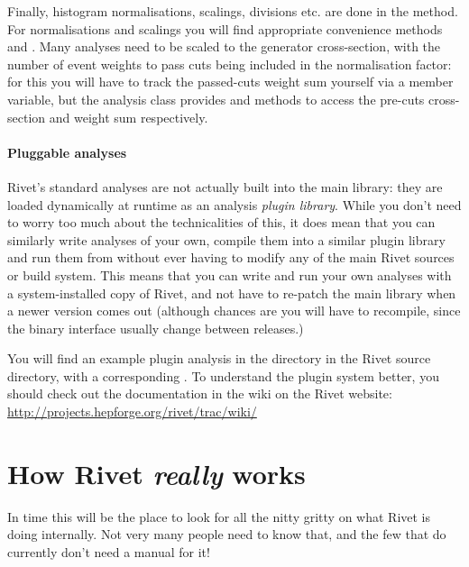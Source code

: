 \documentclass{JHEP3}
\begin{document}
Finally, histogram normalisations, scalings, divisions etc. are done in the
 method. For normalisations and scalings you will
find appropriate convenience methods  and
. Many analyses need to be scaled to
the generator cross-section, with the number of event weights to pass cuts being
included in the normalisation factor: for this you will have to track the
passed-cuts weight sum yourself via a member variable, but the analysis class
provides  and 
methods to access the pre-cuts cross-section and weight sum respectively.


\subsection{Pluggable analyses}

Rivet's standard analyses are not actually built into the main 
library: they are loaded dynamically at runtime as an analysis \emph{plugin
  library}. While you don't need to worry too much about the technicalities of
this, it does mean that you can similarly write analyses of your own, compile
them into a similar plugin library and run them from  without ever
having to modify any of the main Rivet sources or build system. This means that
you can write and run your own analyses with a system-installed copy of Rivet,
and not have to re-patch the main library when a newer version comes out
(although chances are you will have to recompile, since the binary interface usually
change between releases.)

You will find an example plugin analysis in the  directory in
the Rivet source directory, with a corresponding . To understand
the plugin system better, you should check out the documentation in the wiki on
the Rivet website: \url{http://projects.hepforge.org/rivet/trac/wiki/}


\cleardoublepage
\part{How Rivet \emph{really} works}
\label{part:internals}

In time this will be the place to look for all the nitty gritty on what Rivet is
doing internally. Not very many people need to know that, and the few that do
currently don't need a manual for it!
\end{document}
